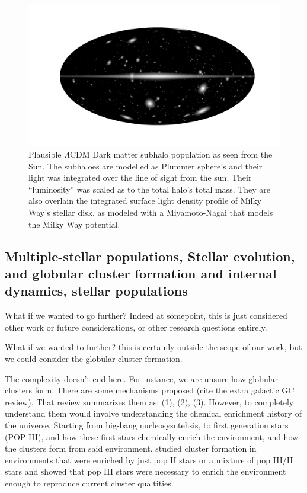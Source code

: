             \begin{figure}
                \includegraphics[width=\linewidth]{images/mollweide-density-with-haloes.png}
                \caption[Plausible $\Lambda$CDM Dark matter subhalo population as seen from the Sun]{Plausible $\Lambda$CDM Dark matter subhalo population as seen from the Sun. The subhaloes are modelled as Plummer sphere's and their light was integrated over the line of sight from the sun. Their ``luminosity'' was scaled as to the total halo's total mass. They are also overlain the integrated surface light density profile of Milky Way's stellar disk, as modeled with a Miyamoto-Nagai that models the Milky Way potential.}
                \label{fig:mollweide-density-with-haloes.png}
            \end{figure}



    \subsection{Multiple-stellar populations, Stellar evolution, and globular cluster formation and internal dynamics, stellar populations}

        What if we wanted to go further? Indeed at somepoint, this is just considered other work or future considerations, or other research questions entirely. 

        What if we wanted to further? this is certainly outside the scope of our work, but we could consider the globular cluster formation. 

        The complexity doesn't end here. For instance, we are unsure how globular clusters form. There are some mechanisms proposed (cite the extra galactic GC review). That review summarizes them as: (1), (2), (3). However, to completely understand them would involve understanding the chemical enrichment history of the universe. Starting from big-bang nucleosysntehsis, to first generation stars (POP III), and how these first stars chemically enrich the environment, and how the clusters form from said environment. \citet{2022A&A...668A.191C} studied cluster formation in environments that were enriched by just pop II stars or a mixture of pop III/II stars and showed that pop III stars were necessary to enrich the environment enough to reproduce current cluster qualtities. 

